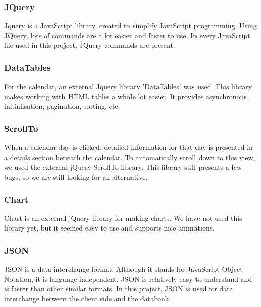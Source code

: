 \subsubsection{JQuery}
Jquery is a JavaScript library, created to simplify JavaScript programming. Using JQuery,
lots of commands are a lot easier and faster to use. In every JavaScript file used in this
project, JQuery commands are present.

\subsubsection{DataTables} 
For the calendar, an external Jquery library 'DataTables' was used. This library makes
working with HTML tables a whole lot easier. It provides asynchronous initialisation,
pagination, sorting, etc.

\subsubsection{ScrollTo}
When a calendar day is clicked, detailed information for that day is presented in a
details section beneath the calendar. To automatically scroll down to this view, we
used the external jQuery ScrollTo library. This library still presents a few bugs, so we
are still looking for an alternative.

\subsubsection{Chart}
Chart is an external jQuery library for making charts. We have not used this library yet,
but it seemed easy to use and supports nice animations.

\subsubsection{JSON}
JSON is a data interchange format. Although it stands for JavaScript Object Notation, it
is language independent. JSON is relatively easy to understand and is faster than other
similar formats. In this project, JSON is used for data interchange between the client
side and the databank. 
